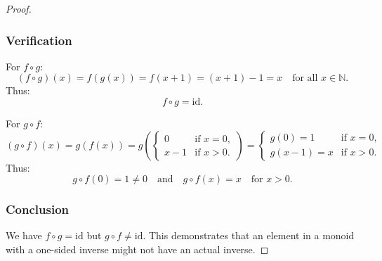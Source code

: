 \documentclass[12pt]{amsart}
\theoremstyle{definition}
\numberwithin{equation}{section}
\begin{document}
\begin{exercise}{5}
\begin{proof}
\subsubsection*{Verification}
For \(f \circ g\):
\[
(f \circ g)(x) = f(g(x)) = f(x+1) = (x+1)-1 = x \quad \text{for all } x \in \mathbb{N}.
\]
Thus:
\[
f \circ g = \text{id}.
\]

For \(g \circ f\):
\[
(g \circ f)(x) = g(f(x)) = g \left(\begin{cases}
0 & \text{if } x = 0, \\
x-1 & \text{if } x > 0.
\end{cases}\right) = \begin{cases}
g(0) = 1 & \text{if } x = 0, \\
g(x-1) = x & \text{if } x > 0.
\end{cases}
\]
Thus:
\[
g \circ f(0) = 1 \neq 0 \quad \text{and} \quad g \circ f(x) = x \quad \text{for } x > 0.
\]

\subsubsection*{Conclusion}
We have \(f \circ g = \text{id}\) but \(g \circ f \neq \text{id}\). This demonstrates that an element in a monoid with a one-sided inverse might not have an actual inverse.

\end{proof}
\end{exercise}
\newpage
\end{document}
